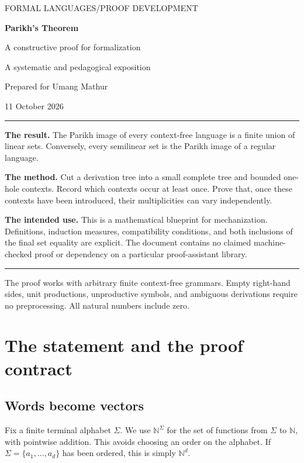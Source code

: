 \documentclass[11pt,a4paper]{article}
\numberwithin{equation}{section}
\theoremstyle{plain}
\theoremstyle{definition}
\theoremstyle{remark}
\newcommand{\N}{\mathbb N}
\begin{document}
\begin{titlepage}
\vspace*{15mm}
{\small\sffamily\color{ink}FORMAL LANGUAGES\quad /\quad PROOF DEVELOPMENT}\par
\vspace{9mm}
{\Huge\bfseries Parikh's Theorem}\par
\vspace{4mm}
{\Large A constructive proof for formalization}\par
\vspace{12mm}
{\large A systematic and pedagogical exposition}\par
\vspace{6mm}
Prepared for Umang Mathur\par
11 October 2026
\vspace{13mm}
\hrule
\vspace{5mm}
\textbf{The result.} The Parikh image of every context-free language is a finite union of linear sets. Conversely, every semilinear set is the Parikh image of a regular language.

\textbf{The method.} Cut a derivation tree into a small complete tree and bounded one-hole contexts. Record which contexts occur at least once. Prove that, once these contexts have been introduced, their multiplicities can vary independently.

\textbf{The intended use.} This is a mathematical blueprint for mechanization. Definitions, induction measures, compatibility conditions, and both inclusions of the final set equality are explicit. The document contains no claimed machine-checked proof or dependency on a particular proof-assistant library.
\vspace{5mm}
\hrule
\vfill
\small
The proof works with arbitrary finite context-free grammars. Empty right-hand sides, unit productions, unproductive symbols, and ambiguous derivations require no preprocessing. All natural numbers include zero.
\end{titlepage}

{\small\setlength{\parskip}{0pt}\tableofcontents}
\newpage

\section{The statement and the proof contract}\label{sec:statement}

\subsection{Words become vectors}
Fix a finite terminal alphabet $\Sigma$. We use $\N^\Sigma$ for the set of functions from $\Sigma$ to $\N$, with pointwise addition. This avoids choosing an order on the alphabet. If $\Sigma=\{a_1,\ldots,a_d\}$ has been ordered, this is simply $\N^d$.
\end{document}
